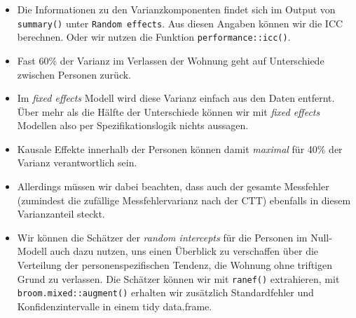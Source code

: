 \documentclass[
]{book}
\newenvironment{Shaded}{\begin{snugshade}}{\end{snugshade}}
\newcommand{\CommentTok}[1]{\textcolor[rgb]{0.56,0.35,0.01}{\textit{#1}}}
\newcommand{\DataTypeTok}[1]{\textcolor[rgb]{0.13,0.29,0.53}{#1}}
\newcommand{\DecValTok}[1]{\textcolor[rgb]{0.00,0.00,0.81}{#1}}
\newcommand{\FloatTok}[1]{\textcolor[rgb]{0.00,0.00,0.81}{#1}}
\newcommand{\KeywordTok}[1]{\textcolor[rgb]{0.13,0.29,0.53}{\textbf{#1}}}
\newcommand{\NormalTok}[1]{#1}
\newcommand{\OperatorTok}[1]{\textcolor[rgb]{0.81,0.36,0.00}{\textbf{#1}}}
\newcommand{\StringTok}[1]{\textcolor[rgb]{0.31,0.60,0.02}{#1}}
\begin{document}
\begin{itemize}
\item
  Die Informationen zu den Varianzkomponenten findet sich im Output von \texttt{summary()} unter \texttt{Random\ effects}. Aus diesen Angaben können wir die ICC berechnen. Oder wir nutzen die Funktion \texttt{performance::icc()}.
\item
  Fast 60\% der Varianz im Verlassen der Wohnung geht auf Unterschiede zwischen Personen zurück.
\item
  Im \emph{fixed effects} Modell wird diese Varianz einfach aus den Daten entfernt. Über mehr als die Hälfte der Unterschiede können wir mit \emph{fixed effects} Modellen also per Spezifikationslogik nichts aussagen.
\item
  Kausale Effekte innerhalb der Personen können damit \emph{maximal} für 40\% der Varianz verantwortlich sein.
\item
  Allerdings müssen wir dabei beachten, dass auch der gesamte Messfehler (zumindest die zufällige Messfehlervarianz nach der CTT) ebenfalls in diesem Varianzanteil steckt.
\item
  Wir können die Schätzer der \emph{random intercepts} für die Personen im Null-Modell auch dazu nutzen, uns einen Überblick zu verschaffen über die Verteilung der personenspezifischen Tendenz, die Wohnung ohne triftigen Grund zu verlassen. Die Schätzer können wir mit \texttt{ranef()} extrahieren, mit \texttt{broom.mixed::augment()} erhalten wir zusätzlich Standardfehler und Konfidenzintervalle in einem tidy data.frame.
\end{itemize}

\begin{Shaded}
\end{Shaded}
\end{document}
